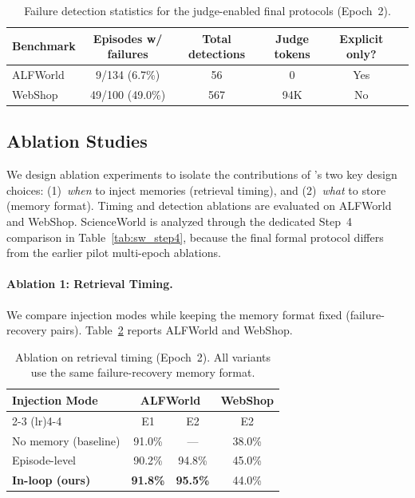 \begin{table}[h]
\centering
\caption{Failure detection statistics for the judge-enabled final protocols (Epoch~2).}
\label{tab:detection_stats}
\small
\begin{tabular}{lccccc}
\toprule
Benchmark & Episodes w/ failures & Total detections & Judge tokens & Explicit only? \\
\midrule
ALFWorld & 9/134 (6.7\%) & 56 & 0 & Yes \\
WebShop & 49/100 (49.0\%) & 567 & 94K & No \\
\bottomrule
\end{tabular}
\end{table}

\subsection{Ablation Studies}
\label{sec:ablation}

We design ablation experiments to isolate the contributions of \method{}'s two key design choices: (1)~\emph{when} to inject memories (retrieval timing), and (2)~\emph{what} to store (memory format). Timing and detection ablations are evaluated on ALFWorld and WebShop. ScienceWorld is analyzed through the dedicated Step~4 comparison in Table~\ref{tab:sw_step4}, because the final formal protocol differs from the earlier pilot multi-epoch ablations.

\paragraph{Ablation 1: Retrieval Timing.}
We compare injection modes while keeping the memory format fixed (failure-recovery pairs). Table~\ref{tab:ablation_timing} reports ALFWorld and WebShop.

\begin{table}[h]
\centering
\caption{Ablation on retrieval timing (Epoch~2). All variants use the same failure-recovery memory format.}
\label{tab:ablation_timing}
\small
\begin{tabular}{lccc}
\toprule
\multirow{2}{*}{Injection Mode} & \multicolumn{2}{c}{ALFWorld} & WebShop \\
\cmidrule(lr){2-3} \cmidrule(lr){4-4}
 & E1 & E2 & E2 \\
\midrule
No memory (baseline) & 91.0\% & --- & 38.0\% \\
Episode-level & 90.2\% & 94.8\% & 45.0\% \\
\textbf{In-loop (ours)} & \textbf{91.8\%} & \textbf{95.5\%} & 44.0\% \\
\bottomrule
\end{tabular}
\end{table}

